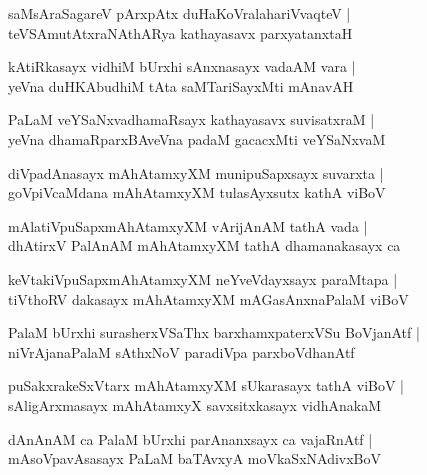 \documentclass[twoside,12pt,openright]{book}
\newcounter{shloka}[chapter]
\begin{document}
\begin{shloka}%
saMsAraSagareV pArxpAtx duHaKoVralahariVvaqteV |\\
teVSAmutAtxraNAthARya kathayasavx parxyatanxtaH
\end{shloka}

\begin{shloka}%
kAtiRkasayx vidhiM bUrxhi sAnxnasayx vadaAM vara |\\
yeVna duHKAbudhiM tAta saMTariSayxMti mAnavAH 
\end{shloka}

\begin{shloka}%
PaLaM veYSaNxvadhamaRsayx kathayasavx suvisatxraM |\\
yeVna dhamaRparxBAveVna padaM gacacxMti veYSaNxvaM 
\end{shloka}

\begin{shloka}%
diVpadAnasayx mAhAtamxyXM munipuSapxsayx suvarxta |\\
goVpiVcaMdana mAhAtamxyXM tulasAyxsutx kathA viBoV 
\end{shloka}

\begin{shloka}%
mAlatiVpuSapxmAhAtamxyXM vArijAnAM tathA vada |\\
dhAtirxV PalAnAM mAhAtamxyXM tathA dhamanakasayx ca 
\end{shloka}

\begin{shloka}%
keVtakiVpuSapxmAhAtamxyXM neYveVdayxsayx paraMtapa |\\
tiVthoRV dakasayx mAhAtamxyXM mAGasAnxnaPalaM viBoV 
\end{shloka}

\begin{shloka}%
PalaM bUrxhi surasherxVSaThx barxhamxpaterxVSu BoVjanAtf |\\
niVrAjanaPalaM sAthxNoV paradiVpa parxboVdhanAtf
\end{shloka}

\begin{shloka}%
puSakxrakeSxVtarx mAhAtamxyXM sUkarasayx tathA viBoV |\\
sAligArxmasayx mAhAtamxyX savxsitxkasayx vidhAnakaM 
\end{shloka}

\begin{shloka}%
dAnAnAM ca PalaM bUrxhi parAnanxsayx ca vajaRnAtf |\\
mAsoVpavAsasayx PaLaM baTAvxyA moVkaSxNAdivxBoV 
\end{shloka}
\end{document}
